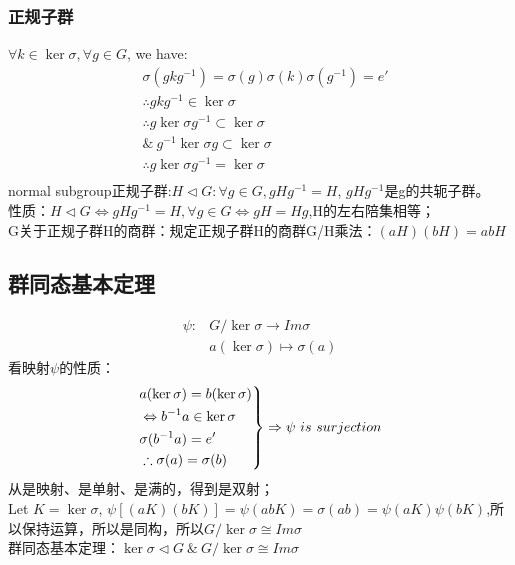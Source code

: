 \subsubsection{正规子群}
$ \forall k \in \ker \sigma, \forall g\in G$, we have:
\begin{equation}
\begin{split}
&\sigma(gkg^{-1})=\sigma(g)\sigma(k)\sigma(g^{-1})=e'\\
& \therefore gkg^{-1}\in \ker \sigma\\
& \therefore g \ker \sigma g^{-1} \subset \ker \sigma\\
& \& \ g^{-1}  \ker \sigma g\subset \ker \sigma\\
& \therefore g \ker \sigma g^{-1}=\ker \sigma\\
\end{split}
\end{equation}
normal subgroup正规子群:$H \lhd G :\forall g \in G, gHg^{-1}=H$, $gHg^{-1}$是g的共轭子群。\\
性质：$H \lhd G \Leftrightarrow gHg^{-1}=H,\forall g \in G \Leftrightarrow gH=Hg$,H的左右陪集相等；\\
G关于正规子群H的商群：规定正规子群H的商群G/H乘法：$(aH)(bH)=abH$\\
\subsection{群同态基本定理}
\begin{equation}
\begin{split}
\psi : &G/ \ker \sigma \to Im \sigma\\
& a (\ker \sigma) \mapsto \sigma(a)
\end{split}
\end{equation}
看映射$\psi$的性质：
\begin{equation}
\label{证明同构1}
\left.
\begin{aligned}
& a(\ker \sigma)=b(\ker \sigma)\\
& \Leftrightarrow b^{-1}a \in \ker \sigma\\
&\sigma(b^{-1}a)=e'\\
&\therefore \sigma(a)=\sigma(b)
\end{aligned}
\right\} \Rightarrow \psi \ is \ surjection\\
\end{equation}
从是映射、是单射、是满的，得到是双射；\\
Let $K=\ker \sigma$, $\psi [(aK)(bK)]=\psi (abK)=\sigma(ab)=\psi(aK)\psi(bK)$,所以保持运算，所以是同构，所以$G/ \ker \sigma \cong Im \sigma$\\
群同态基本定理：$\ker \sigma \lhd G \ \& \   G/ \ker \sigma \cong Im \sigma  $ 




